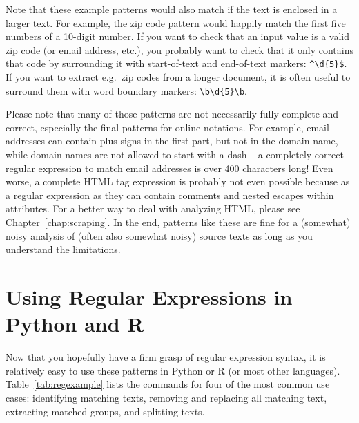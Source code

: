 Note that these example patterns would also match if the text is enclosed in a larger text.
For example, the zip code pattern would happily match the first five numbers of a 10-digit number.
If you want to check that an input value is a valid zip code (or email address, etc.),
you probably want to check that it only contains that code by surrounding it with start-of-text and end-of-text markers: \verb|^\d{5}$|.
If you want to extract e.g.\ zip codes from a longer document, it is often useful to surround them with word boundary markers: \verb|\b\d{5}\b|.

Please note that many of those patterns are not necessarily fully complete and correct, especially the final patterns for online notations.
For example, email addresses can contain plus signs in the first part, but not in the domain name, while domain names are not allowed to start with a dash -- a completely correct regular expression to match email addresses is over 400 characters long!
Even worse, a complete HTML tag expression is probably not even possible because as a regular expression as they can contain comments and nested escapes within attributes.
For a better way to deal with analyzing HTML, please see Chapter~\ref{chap:scraping}. In the end, patterns like these are fine for a (somewhat) noisy analysis of (often also somewhat noisy) source texts as long as you understand the limitations.

\section{Using Regular Expressions in Python and R}\label{sec:regextract}

Now that you hopefully have a firm grasp of regular expression syntax,
it is relatively easy to use these patterns in Python or R (or most other languages).
Table~\ref{tab:regexample} lists the commands for four of the most common use cases:
identifying matching texts, removing and replacing all matching text, extracting matched groups, and splitting texts.

%

